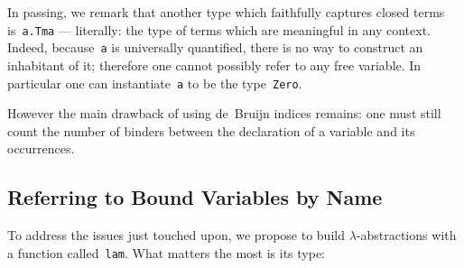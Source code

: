 \documentclass[9pt,authoryear]{sigplanconf}
\begin{document}
%
In passing, we remark that another type which faithfully captures
    closed terms is{~}\texttt{\makebox[1.22ex][c]{$ \forall $}}\texttt{\mbox{\hspace{0.50em}}}\texttt{a}\texttt{.}\texttt{\mbox{\hspace{0.50em}}}\texttt{Tm}\texttt{\mbox{\hspace{0.50em}}}\texttt{a} --- literally{:} the type of terms
    which are meaningful in any context. Indeed, because{~}\texttt{a} is
    universally quantified, there is no way to construct an inhabitant
    of it; therefore one cannot possibly refer to any free variable. In
    particular one can instantiate{~}\texttt{a} to be the type{~}\texttt{Zero}.%


%
However the main drawback of using de{~}Bruijn indices remains{:} one
    must still count the number of binders between the declaration of a
    variable and its occurrences.%


\subsection{Referring to Bound Variables by Name}

%
To address the issues just touched upon, we propose to build
    $ \lambda $-abstractions with a function called{~}\texttt{lam}. What matters the most
    is its type{:}%


{\nopagebreak }
\end{document}
